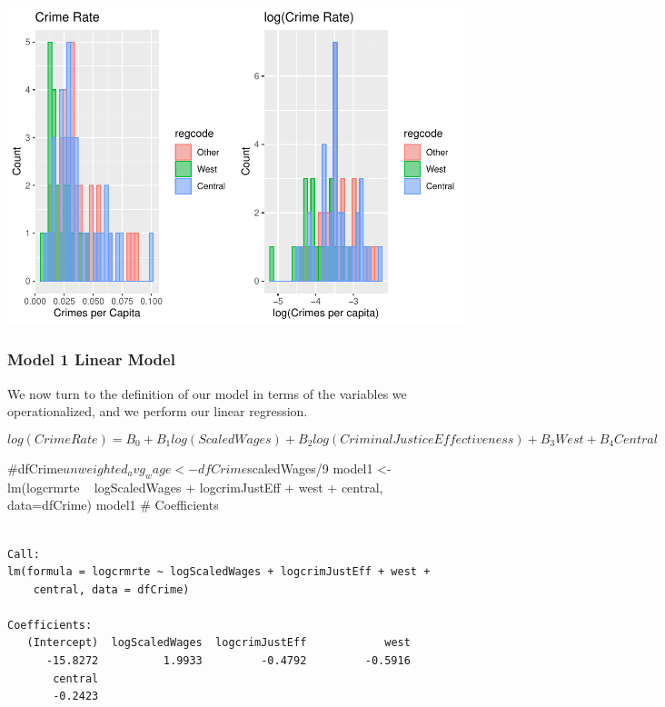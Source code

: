 \documentclass[]{article}
\newenvironment{Shaded}{}{}
\newcommand{\CommentTok}[1]{\textcolor[rgb]{0.00,0.50,0.00}{#1}}
\newcommand{\DataTypeTok}[1]{#1}
\newcommand{\KeywordTok}[1]{\textcolor[rgb]{0.00,0.00,1.00}{#1}}
\newcommand{\NormalTok}[1]{#1}
\newcommand{\OperatorTok}[1]{#1}
\newcommand{\StringTok}[1]{\textcolor[rgb]{0.00,0.50,0.50}{#1}}
\begin{document}
\includegraphics{Bagnard_Gaustad_Hartman_Leung_Lab_3_files/figure-latex/unnamed-chunk-57-1.pdf}

\hypertarget{model-1-linear-model}{%
\subsubsection{Model 1 Linear Model}\label{model-1-linear-model}}

We now turn to the definition of our model in terms of the variables we
operationalized, and we perform our linear regression.

\[ log(Crime Rate) = B_0 + B_1log(Scaled Wages) + B_2log(Criminal Justice Effectiveness) + B_3West + B_4Central\]

\begin{Shaded}
\begin{Highlighting}[]
\CommentTok{#dfCrime$unweighted_avg_wage <- dfCrime$scaledWages/9}
\NormalTok{model1 <-}\StringTok{ }\KeywordTok{lm}\NormalTok{(logcrmrte }\OperatorTok{~}\StringTok{ }\NormalTok{logScaledWages }\OperatorTok{+}\StringTok{ }\NormalTok{logcrimJustEff }\OperatorTok{+}\StringTok{ }\NormalTok{west }\OperatorTok{+}\StringTok{ }\NormalTok{central, }\DataTypeTok{data=}\NormalTok{dfCrime)}
\NormalTok{model1 }\CommentTok{# Coefficients}
\end{Highlighting}
\end{Shaded}

\begin{verbatim}

Call:
lm(formula = logcrmrte ~ logScaledWages + logcrimJustEff + west + 
    central, data = dfCrime)

Coefficients:
   (Intercept)  logScaledWages  logcrimJustEff            west  
      -15.8272          1.9933         -0.4792         -0.5916  
       central  
       -0.2423  
\end{verbatim}
\end{document}
